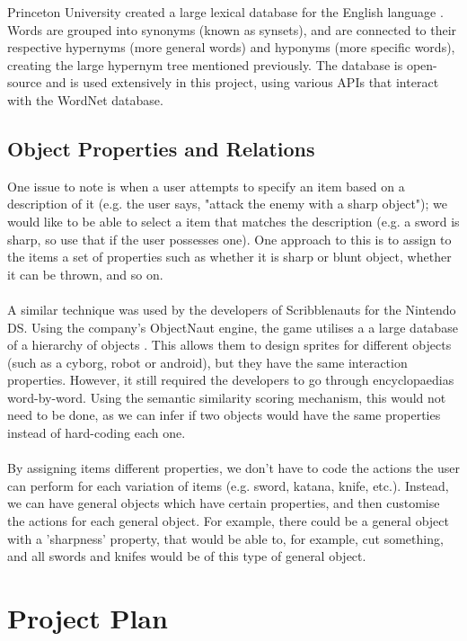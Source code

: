 \documentclass[12pt]{article}
\begin{document}
Princeton University created a large lexical database for the English language \cite{RefWorks:20}. Words are grouped into synonyms (known as synsets), and are connected to their respective hypernyms (more general words) and hyponyms (more specific words), creating the large hypernym tree mentioned previously. The database is open-source and is used extensively in this project, using various APIs that interact with the WordNet database.

\subsection{Object Properties and Relations}

One issue to note is when a user attempts to specify an item based on a description of it (e.g. the user says, "attack the enemy with a sharp object"); we would like to be able to select a item that matches the description (e.g. a sword is sharp, so use that if the user possesses one). One approach to this is to assign to the items a set of properties such as whether it is sharp or blunt object, whether it can be thrown, and so on.
\\
\\
A similar technique was used by the developers of Scribblenauts for the Nintendo DS. Using the company's ObjectNaut engine, the game utilises a a large database of a hierarchy of objects \cite{RefWorks:48}. This allows them to design sprites for different objects (such as a cyborg, robot or android), but they have the same interaction properties. However, it still required the developers to go through encyclopaedias word-by-word. Using the semantic similarity scoring mechanism, this would not need to be done, as we can infer if two objects would have the same properties instead of hard-coding each one.
\\
\\
By assigning items different properties, we don't have to code the actions the user can perform for each variation of items (e.g. sword, katana, knife, etc.). Instead, we can have general objects which have certain properties, and then customise the actions for each general object. For example, there could be a general object with a 'sharpness' property, that would be able to, for example, cut something, and all swords and knifes would be of this type of general object.

\newpage
\section{Project Plan}
\end{document}
